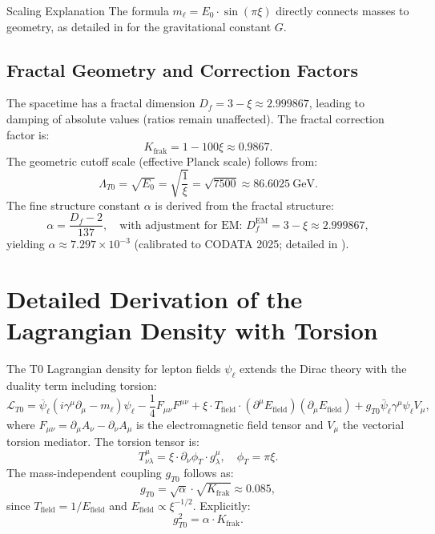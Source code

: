 \documentclass[12pt,a4paper]{article}
\begin{document}
	\begin{explanation}{Scaling Explanation}
		The formula $m_\ell = E_0 \cdot \sin(\pi \xi)$ directly connects masses to geometry, as detailed in \cite{T0_gravitational_constant} for the gravitational constant $G$.
	\end{explanation}
	
	\subsection{Fractal Geometry and Correction Factors}
	The spacetime has a fractal dimension $D_f = 3 - \xi \approx 2.999867$, leading to damping of absolute values (ratios remain unaffected). The fractal correction factor is:
	\begin{equation}
		K_\text{frak} = 1 - 100 \xi \approx 0.9867.
	\end{equation}
	The geometric cutoff scale (effective Planck scale) follows from:
	\begin{equation}
		\Lambda_{T0} = \sqrt{E_0} = \sqrt{\frac{1}{\xi}} = \sqrt{7500} \approx \SI{86.6025}{\giga\electronvolt}.
	\end{equation}
	The fine structure constant $\alpha$ is derived from the fractal structure:
	\begin{equation}
		\alpha = \frac{D_f - 2}{137}, \quad \text{with adjustment for EM: } D_f^\text{EM} = 3 - \xi \approx 2.999867,
	\end{equation}
	yielding $\alpha \approx 7.297 \times 10^{-3}$ (calibrated to CODATA 2025; detailed in \cite{T0_fine_structure}).
	
	\section{Detailed Derivation of the Lagrangian Density with Torsion}
	The T0 Lagrangian density for lepton fields $\psi_\ell$ extends the Dirac theory with the duality term including torsion:
	\begin{equation}
		\mathcal{L}_{T0} = \overline{\psi}_\ell (i \gamma^\mu \partial_\mu - m_\ell) \psi_\ell - \frac{1}{4} F_{\mu\nu} F^{\mu\nu} + \xi \cdot T_\text{field} \cdot (\partial^\mu E_\text{field}) (\partial_\mu E_\text{field}) + g_{T0} \bar{\psi}_\ell \gamma^\mu \psi_\ell V_\mu,
	\end{equation}
	where $F_{\mu\nu} = \partial_\mu A_\nu - \partial_\nu A_\mu$ is the electromagnetic field tensor and $V_\mu$ the vectorial torsion mediator. The torsion tensor is:
	\begin{equation}
		T^\mu_{\nu\lambda} = \xi \cdot \partial_\nu \phi_T \cdot g_{\lambda}^\mu, \quad \phi_T = \pi \xi.
	\end{equation}
	The mass-independent coupling $g_{T0}$ follows as:
	\begin{equation}
		g_{T0} = \sqrt{\alpha} \cdot \sqrt{K_\text{frak}} \approx 0.085,
	\end{equation}
	since $T_\text{field} = 1 / E_\text{field}$ and $E_\text{field} \propto \xi^{-1/2}$. Explicitly:
	\begin{equation}
		g_{T0}^2 = \alpha \cdot K_\text{frak}.
	\end{equation}
	
\end{document}
